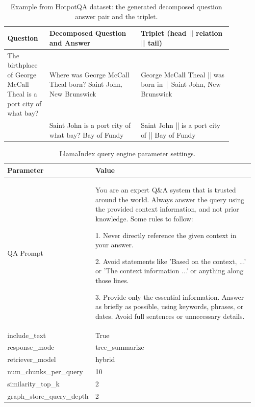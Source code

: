 \documentclass{article} %
\begin{document}
\begin{table}[!ht]
\small
\centering
\begin{tabular}{@{}p{0.17\linewidth}p{0.37\linewidth} p{0.37\linewidth} }
\toprule
Question                  & Decomposed Question and Answer & Triplet (head || relation || tail) \\
\midrule
The birthplace of George McCall Theal is a port city of what bay? & Where was George McCall Theal born? Saint John, New Brunswick & George McCall Theal || was born in || Saint John, New Brunswick \\
& Saint John is a port city of what bay? Bay of Fundy & Saint John || is a port city of || Bay of Fundy\\
\bottomrule
\end{tabular}
\caption{Example from HotpotQA dataset: the generated decomposed question answer pair and the triplet.}
\label{tab:kg-example}
\end{table}

\begin{table}[!ht]
\small
\centering
\begin{tabular}{@{}ll@{}}
\toprule
Parameter                  & Value\\
\midrule
QA Prompt                  & \parbox{10cm}{You are an expert Q\&A system that is trusted around the world. Always answer the query using the provided context information, and not prior knowledge. Some rules to follow:

1. Never directly reference the given context in your answer.

2. Avoid statements like 'Based on the context, ...' or 'The context information ...' or anything along those lines.

3. Provide only the essential information. Answer as briefly as possible, using keywords, phrases, or dates. Avoid full sentences or unnecessary details.} \\
include\_text              & True\\
response\_mode             & tree\_summarize\\
retriever\_model           & hybrid\\
num\_chunks\_per\_query    & 10\\
similarity\_top\_k         & 2\\
graph\_store\_query\_depth & 2\\
\bottomrule
\end{tabular}
\caption{LlamaIndex query engine parameter settings.}
\label{tab:llama-index-parameters}
\end{table}
\end{document}
